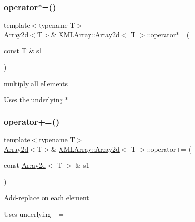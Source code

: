 \subsubsection{\texorpdfstring{operator$\ast$=()}{operator*=()}\hspace{0.1cm}{\footnotesize\ttfamily [6/6]}}
{\footnotesize\ttfamily template$<$typename T$>$ \\
\mbox{\hyperlink{classXMLArray_1_1Array2d}{Array2d}}$<$T$>$\& \mbox{\hyperlink{classXMLArray_1_1Array2d}{X\+M\+L\+Array\+::\+Array2d}}$<$ T $>$\+::operator$\ast$= (\begin{DoxyParamCaption}\item[{const T \&}]{s1 }\end{DoxyParamCaption})\hspace{0.3cm}{\ttfamily [inline]}}



multiply all ellements 

Uses the underlying $\ast$= \mbox{\label{classXMLArray_1_1Array2d_a1e4469713c271b4d9c02ac881cdf00dd}} 
\subsubsection{\texorpdfstring{operator+=()}{operator+=()}\hspace{0.1cm}{\footnotesize\ttfamily [1/3]}}
{\footnotesize\ttfamily template$<$typename T$>$ \\
\mbox{\hyperlink{classXMLArray_1_1Array2d}{Array2d}}$<$T$>$\& \mbox{\hyperlink{classXMLArray_1_1Array2d}{X\+M\+L\+Array\+::\+Array2d}}$<$ T $>$\+::operator+= (\begin{DoxyParamCaption}\item[{const \mbox{\hyperlink{classXMLArray_1_1Array2d}{Array2d}}$<$ T $>$ \&}]{s1 }\end{DoxyParamCaption})\hspace{0.3cm}{\ttfamily [inline]}}



Add-\/replace on each element. 

Uses underlying += \mbox{\label{classXMLArray_1_1Array2d_a1e4469713c271b4d9c02ac881cdf00dd}} 
